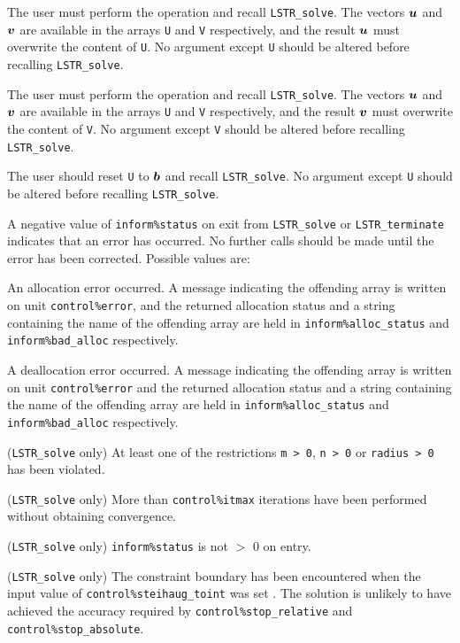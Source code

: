 \documentclass{galahad}
\newcommand{\packagename}{LS\-TR}
\begin{document}
\begin{description}

 The user must perform the operation
\disp{\bmu := \bmu + \bmA \bmv,}
and recall {\tt \packagename\_solve}.
The vectors ${\bm{u}}$ and ${\bm{v}}$ are available in the arrays {\tt U}
and {\tt V} respectively, and the result
${\bm{u}}$ must overwrite the content of {\tt U}.
No argument except {\tt U} should be altered before recalling
{\tt \packagename\_solve}.

 The user must perform the operation
and recall {\tt \packagename\_solve}.
The vectors ${\bm{u}}$ and ${\bm{v}}$ are available in the arrays {\tt U}
and {\tt V} respectively, and the result
${\bm{v}}$ must overwrite the content of {\tt V}.
No argument except {\tt V} should be altered before recalling
{\tt \packagename\_solve}.

  The user should reset {\tt U} to ${\bm{b}}$ and recall
{\tt \packagename\_solve}.
No argument except {\tt U} should be altered before recalling
{\tt \packagename\_solve}.

\end{description}


\galerrors
A negative value of  {\tt inform\%status} on exit from
{\tt \packagename\_solve}
or
{\tt \packagename\_terminate}
indicates that an error has occurred. No further calls should be made
until the error has been corrected. Possible values are:

\begin{description}
 An allocation error occurred. A message indicating
the offending
array is written on unit {\tt control\%error}, and the returned allocation
status and a string containing the name of the offending array
are held in {\tt inform\%alloc\_\-status}
and {\tt inform\%bad\_alloc} respectively.

 A deallocation error occurred.
A message indicating the offending
array is written on unit {\tt control\%error} and the returned allocation
status and a string containing the name of the offending array
are held in {\tt inform\%alloc\_\-status}
and {\tt inform\%bad\_alloc} respectively.

 ({\tt \packagename\_solve} only)
At least one of the restrictions
{\tt m > 0},
{\tt n > 0}
or
{\tt radius > 0}
has been violated.

 ({\tt \packagename\_solve} only) More than
{\tt control\%itmax} iterations have been performed without obtaining
convergence.

 ({\tt \packagename\_solve} only)  {\tt inform\%status} is
not $>$ 0 on entry.

 ({\tt \packagename\_solve} only)
The constraint boundary has been
encountered when the input value of {\tt control\%steihaug\-\_\-toint} was
set \true. The
solution is unlikely to have achieved the accuracy required by
{\tt control\%stop\_rela\-tive} and {\tt control\%stop\_absolute}.

\end{description}
\end{document}
